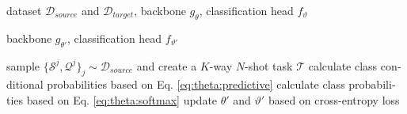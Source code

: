 \begin{latin}
	\begin{algorithm}
		\caption{fine-grained classifier (training)}\label{alg:fine:train}
		\begin{algorithmic}[1]
			\renewcommand{\algorithmicrequire}{\textbf{Input:}}
			\renewcommand{\algorithmicensure}{\textbf{Output:}}
			\renewcommand{\algorithmiccomment}[1]{\hfill \textit{//#1}}
			\REQUIRE dataset $\mathcal{D}_{source}$ and $\mathcal{D}_{target}$, backbone $g_\theta$, classification head $f_\vartheta$
			
			\ENSURE backbone $g_{\theta'}$, classification head $f_{\vartheta'}$
			
			\STATE sample $\{\mathcal{S}^j, \mathcal{Q}^j\}_j \sim \mathcal{D}_{source}$ and create a $K$-way $N$-shot task $\mathcal{T}$
			\STATE calculate class conditional probabilities based on Eq.
			\ref{eq:theta:predictive}
			\STATE calculate class probabilities based on Eq. \ref{eq:theta:softmax}
			\STATE update $\theta'$ and $\vartheta'$ based on cross-entropy loss
			\ENDWHILE

		\end{algorithmic}
	\end{algorithm}
\end{latin}

